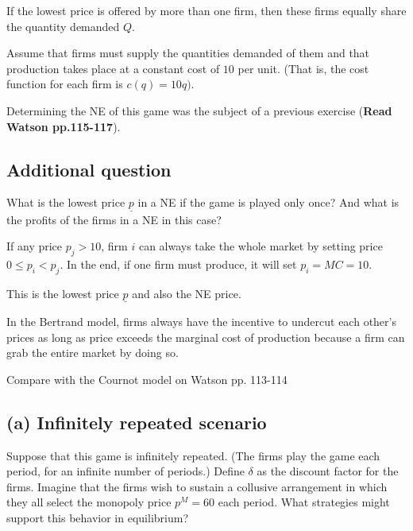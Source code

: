 \documentclass{article}
\begin{document}
\smallskip

If the lowest price is offered by more than
one firm, then these firms equally share the quantity demanded $Q$. 

\smallskip

Assume that firms must supply the quantities demanded of them and that production takes place at a constant cost of $10$ per unit. (That is, the cost function for each firm is $c (q) = 10q)$. 

\smallskip

Determining the NE of this game was the subject of a previous exercise (\textbf{Read Watson pp.115-117}).


\subsection*{Additional question}

What is the lowest price $\underline{p}$ in a NE if the game is played only once? And what is the profits of the firms in a NE in this case? 

\bigskip

If any price $p_j>10$, firm $i$ can always take the whole market by setting 
price $0 \le p_i <p_j$. In the end, if one firm must produce, it will set
$p_i = MC = 10$.

\smallskip

This is the lowest price $\underline{p}$ and also the NE price.

\begin{mdframed}[backgroundcolor=blue!20,linecolor=white]

In the Bertrand model, firms always have the incentive to undercut each other’s prices as long as price exceeds the marginal
cost of production because a firm can grab the entire market by doing so. 

\medskip

Compare with the Cournot model on Watson pp. 113-114

\end{mdframed}

\subsection*{(a) Infinitely repeated scenario}

Suppose that this game is infinitely repeated. (The firms play the
game each period, for an infinite number of periods.) Define $\delta$  as the
discount factor for the firms. Imagine that the firms wish to sustain
a collusive arrangement in which they all select the monopoly price
$p^M = 60$ each period. What strategies might support this behavior in
equilibrium? 
\end{document}
